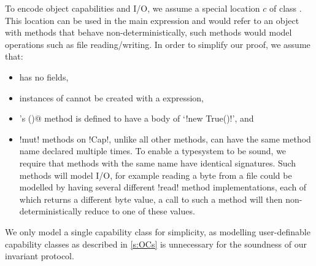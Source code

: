 \noindent To encode object capabilities and I/O, we assume a special location  $c$ of class \Q@Cap@. This location can be used in the main expression and would refer to an object with methods that behave non-deterministically, such methods would model operations such as file reading/writing. In order to simplify our proof, we assume that:
\begin{itemize}
	\item \Q@Cap@ has no fields,
	\item instances of \Q@Cap@ cannot be created with a \Q@new@ expression,
	\item \Q@Cap@'s \Q@invariant()@ method is defined to have a body of `\Q!new True()!', and
	

	
	\item \Q!mut! methods on \Q!Cap!, unlike all other methods, can have the same method name declared multiple times. To enable a typesystem to be sound, we require that methods with the same name have identical signatures.
	Such methods will model I/O, for example reading a byte from a file could be modelled by having several different \Q!read! method implementations, each of which returns a different byte value,
	a call to such a method will then non-deterministically reduce to one of these values.
\end{itemize}
We only model a single \Q@Cap@ capability class for simplicity, as modelling user-definable capability classes as described in \ref{s:OCs} is unnecessary for the soundness of our invariant protocol.

